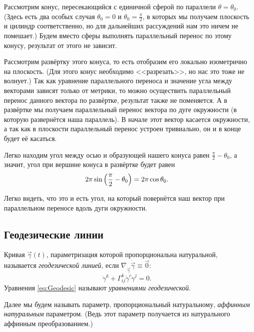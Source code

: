 \begin{secondsolution}
	Рассмотрим конус, пересекающийся с единичной сферой по параллели $\theta = \theta_0$. (Здесь есть два особых случая $\theta_0 = 0$ и $\theta_0 = \frac{\pi}{2}$, в которых мы получаем плоскость и цилиндр соответственно, но для дальнейших рассуждений нам это ничем не помешает.) Будем вместо сферы выполнять параллельный перенос по этому конусу, результат от этого не зависит.

	Рассмотрим развёртку этого конуса, то есть отобразим его локально изометрично на плоскость. (Для этого конус необходимо <<разрезать>>, но нас это тоже не волнует.) Так как уравнение параллельного переноса и значение угла между векторами зависят только от метрики, то можно осуществить параллельный перенос данного вектора по развёртке, результат также не поменяется. А в развёртке мы получаем параллельный перенос вектора по дуге окружности (в которую развернётся наша параллель). В начале этот вектор касается окружности, а так как в плоскости параллельный перенос устроен тривиально, он и в конце будет её касаться.

	Легко находим угол между осью и образующей нашего конуса равен $\frac{\pi}{2} - \theta_0$, а значит, угол при вершине конуса в развёртке будет равен
	\[
		2\pi\sin\left(\frac{\pi}{2} - \theta_0\right) = 2\pi\cos\theta_0.
	\]

	Легко видеть, что это и есть угол, на который повернётся наш вектор при параллельном переносе вдоль дуги окружности.
\end{secondsolution}

\subsection{Геодезические линии}

\begin{definition}
	Кривая $\vec{\gamma}(t)$, параметризация которой пропорциональна натуральной, называется \textit{геодезической линией}, если $\nabla_{\dot{\vec{\gamma}}}\dot{\vec{\gamma}} \equiv \vec{0}$:
	\begin{equation} \label{eq:Geodesic}
		\ddot{\gamma}^k + \Gamma_{ij}^k\dot{\gamma}^i\dot\gamma^j = 0.
	\end{equation}
	Уравнения \eqref{eq:Geodesic} называют \textit{уравнениями геодезической}.
\end{definition}

Далее мы будем называть параметр, пропорциональный натуральному, \textit{аффинным натуральным} параметром. (Ведь этот параметр получается из натурального аффинным преобразованием.)

